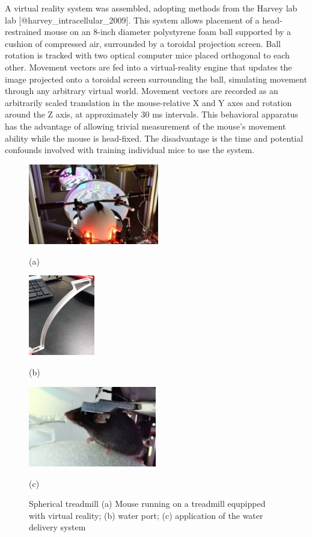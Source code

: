 A virtual reality system was assembled, adopting methods from the Harvey lab lab {[}@harvey\_intracellular\_2009{]}.
This system allows placement of a head-restrained mouse on an 8-inch diameter polystyrene foam ball supported by a cushion of compressed air, surrounded by a toroidal projection screen.
Ball rotation is tracked with two optical computer mice placed orthogonal to each other.
Movement vectors are fed into a virtual-reality engine that updates the image projected onto a toroidal screen surrounding the ball, simulating movement through any arbitrary virtual world.
Movement vectors are recorded as an arbitrarily scaled translation in the mouse-relative X and Y axes and rotation around the Z axis, at approximately 30 ms intervals.
This behavioral apparatus has the advantage of allowing trivial measurement of the mouse's movement ability while the mouse is head-fixed.
The disadvantage is the time and potential confounds involved with training individual mice to use the system.

\begin{figure}[htb]
	\begin{minipage}[t]{0.32\linewidth}\centering
		\includegraphics[height=3.5cm]{01-treadmill-mouse-running.jpg}
		\centerline{(a)}
	\end{minipage}
	\hfill
	\begin{minipage}[t]{0.15\linewidth}\centering
		\includegraphics[height=3.5cm]{01-water-port.jpg}
		\centerline{(b)}
	\end{minipage}
	\begin{minipage}[t]{0.45\linewidth}\centering
		\includegraphics[height=3.5cm]{03-water-delivery-zoom.jpg}
		\centerline{(c)}
	\end{minipage}
	\caption{
		Spherical treadmill (a) Mouse running on a treadmill equpipped with virtual reality;
		(b) water port; (c) application of the water delivery system }
	\label{fig:Spherical treadmill}
\end{figure}

